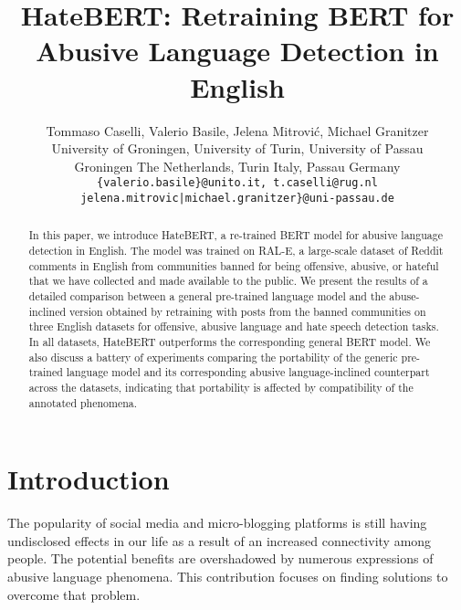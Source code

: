 \documentclass[11pt]{article}
\title{HateBERT: Retraining BERT for Abusive Language Detection in English}
\author{Tommaso Caselli, Valerio Basile, Jelena Mitrovi\'{c}, Michael Granitzer \\
University of Groningen, University of Turin, University of Passau \\
         Groningen The Netherlands, Turin Italy, Passau Germany  \\
\tt \{valerio.basile\}@unito.it, 
 t.caselli@rug.nl \\ \tt {jelena.mitrovic|michael.granitzer\}@uni-passau.de}\\
}
\date{}
\begin{document}
\maketitle
\begin{abstract}
  In this paper, we introduce HateBERT, a re-trained BERT model for abusive language detection in English. The model was trained on RAL-E, a large-scale dataset of Reddit comments in English from communities banned for being offensive, abusive, or hateful that we have collected and made available to the public. We present the results of a detailed comparison between a general pre-trained language model and the abuse-inclined version obtained by retraining with posts from the banned communities on three English datasets for offensive, abusive language and hate speech detection tasks. In all datasets, HateBERT outperforms the corresponding general BERT model. We also discuss a battery of experiments comparing the portability of the generic pre-trained language model and its corresponding abusive language-inclined counterpart across the datasets, indicating that portability is affected by compatibility of the annotated phenomena.
\end{abstract}


\section{Introduction}

The popularity of social media and micro-blogging platforms is still having undisclosed effects in our life as a result of an increased connectivity among people. The potential benefits are overshadowed by numerous expressions of abusive language phenomena. This contribution focuses on finding solutions to overcome that problem.
\end{document}
